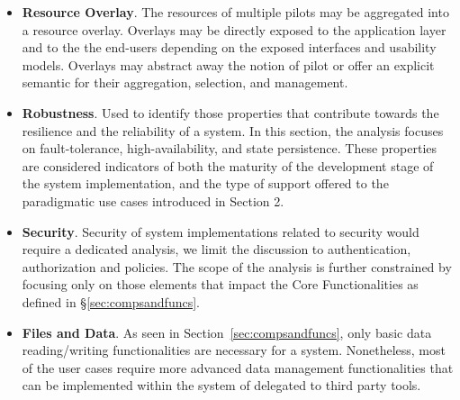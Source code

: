 \documentclass{sig-alternate}
\begin{document}
\begin{itemize}
\item \textbf{Resource Overlay}. The resources of multiple pilots may be
  aggregated into a resource overlay. Overlays may be directly exposed to the
  application layer and to the the end-users depending on the exposed
  interfaces and usability models. Overlays may abstract away the notion of
  pilot or offer an explicit semantic for their aggregation, selection, and
  management.

\item \textbf{Robustness}. Used to identify those properties that contribute
  towards the resilience and the reliability of a \pilot system. In this
  section, the analysis focuses on fault-tolerance, high-availability, and
  state persistence. These properties are considered indicators of both the
  maturity of the development stage of the \pilot system implementation, and
  the type of support offered to the paradigmatic use cases introduced in
  Section 2.


\item \textbf{Security}. Security of \pilot system implementations related to
  security would require a dedicated analysis, we limit the discussion to
  authentication, authorization and policies. The scope of the analysis is
  further constrained by focusing only on those elements that impact the Core
  Functionalities as defined in \S\ref{sec:compsandfuncs}.


\item \textbf{Files and Data}. As seen in Section~\ref{sec:compsandfuncs}, only
  basic data reading/writing functionalities are necessary for a \pilot system.
  Nonetheless, most of the user cases require more advanced data management
  functionalities that can be implemented within the \pilot system of delegated
  to third party tools.


\end{itemize}
\end{document}
